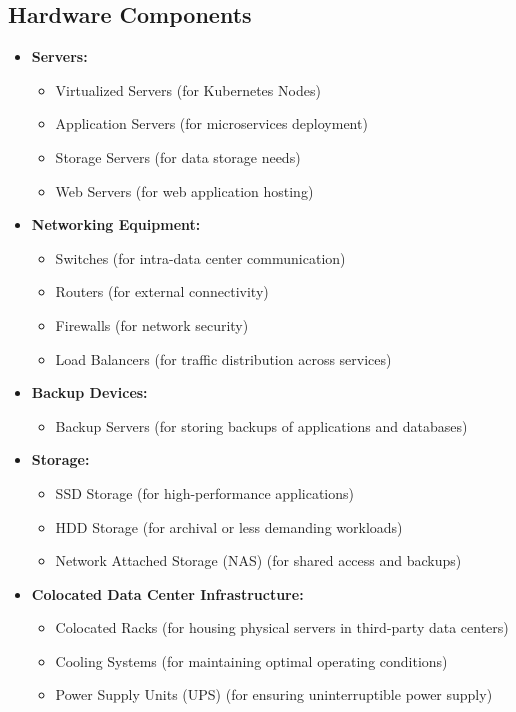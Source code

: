 \subsection*{Hardware Components}
\begin{itemize}
    \item \textbf{Servers:}
    \begin{itemize}
        \item Virtualized Servers (for Kubernetes Nodes)
        \item Application Servers (for microservices deployment)
        \item Storage Servers (for data storage needs)
        \item Web Servers (for web application hosting)
    \end{itemize}
    \item \textbf{Networking Equipment:}
    \begin{itemize}
        \item Switches (for intra-data center communication)
        \item Routers (for external connectivity)
        \item Firewalls (for network security)
        \item Load Balancers (for traffic distribution across services)
    \end{itemize}
    \item \textbf{Backup Devices:}
    \begin{itemize}
        \item Backup Servers (for storing backups of applications and databases)
    \end{itemize}
    \item \textbf{Storage:}
    \begin{itemize}
        \item SSD Storage (for high-performance applications)
        \item HDD Storage (for archival or less demanding workloads)
        \item Network Attached Storage (NAS) (for shared access and backups)
    \end{itemize}
    \item \textbf{Colocated Data Center Infrastructure:}
    \begin{itemize}
        \item Colocated Racks (for housing physical servers in third-party data centers)
        \item Cooling Systems (for maintaining optimal operating conditions)
        \item Power Supply Units (UPS) (for ensuring uninterruptible power supply)
    \end{itemize}
\end{itemize}

